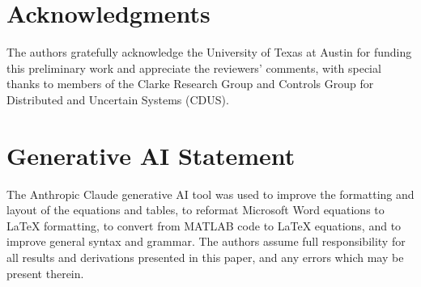 \documentclass[conf]{new-aiaa}
\begin{document}
\section*{Acknowledgments}

The authors gratefully acknowledge the University of Texas at Austin for funding this preliminary work and appreciate the reviewers’ comments, with special thanks to members of the Clarke Research Group and Controls Group for Distributed and Uncertain Systems (CDUS).

\section*{Generative AI Statement}

The Anthropic Claude \cite{refs:claude} generative AI tool was used to improve the formatting and layout of the equations and tables, to reformat Microsoft Word equations to LaTeX formatting, to convert from MATLAB code to LaTeX equations, and to improve general syntax and grammar. The authors assume full responsibility for all results and derivations presented in this paper, and any errors which may be present therein.


\end{document}
